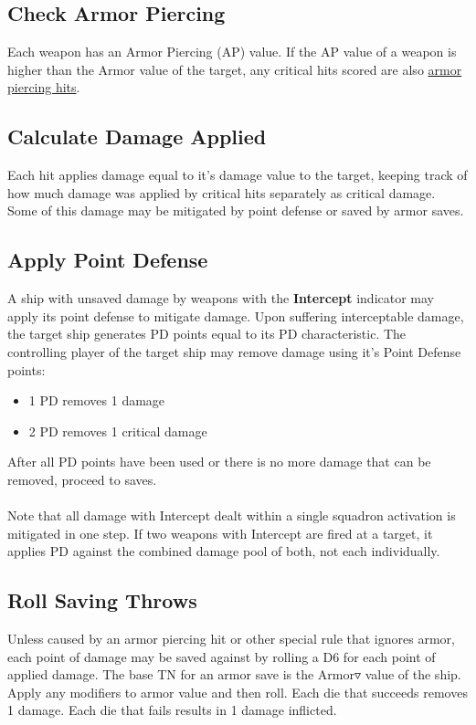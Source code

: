 \subsection{Check Armor Piercing}
Each weapon has an Armor Piercing (AP) value. If the AP value of a weapon is higher than the Armor value of the target, any critical hits scored are also \underline{armor piercing hits}.

\subsection{Calculate Damage Applied}
Each hit applies damage equal to it's damage value to the target, keeping track of how much damage was applied by critical hits separately as critical damage. Some of this damage may be mitigated by point defense or saved by armor saves.

\subsection{Apply Point Defense} \label{sec:PointDefense}
A ship with unsaved damage by weapons with the \textbf{Intercept} indicator may apply its point defense to mitigate damage. Upon suffering interceptable damage, the target ship generates PD points equal to its PD characteristic. The controlling player of the target ship may remove damage using it's Point Defense points:
\begin{itemize}
	\item 1 PD removes 1 damage
	\item 2 PD removes 1 critical damage
\end{itemize}
After all PD points have been used or there is no more damage that can be removed, proceed to saves. 
\\\\
Note that all damage with Intercept dealt within a single squadron activation is mitigated in one step. If two weapons with Intercept are fired at a target, it applies PD against the combined damage pool of both, not each individually.

\subsection{Roll Saving Throws}
Unless caused by an armor piercing hit or other special rule that ignores armor, each point of damage may be saved against by rolling a D6 for each point of applied damage. The base TN for an armor save is the Armor$\triangledown$ value of the ship. Apply any modifiers to armor value and then roll. Each die that succeeds removes 1 damage. Each die that fails results in 1 damage inflicted.

